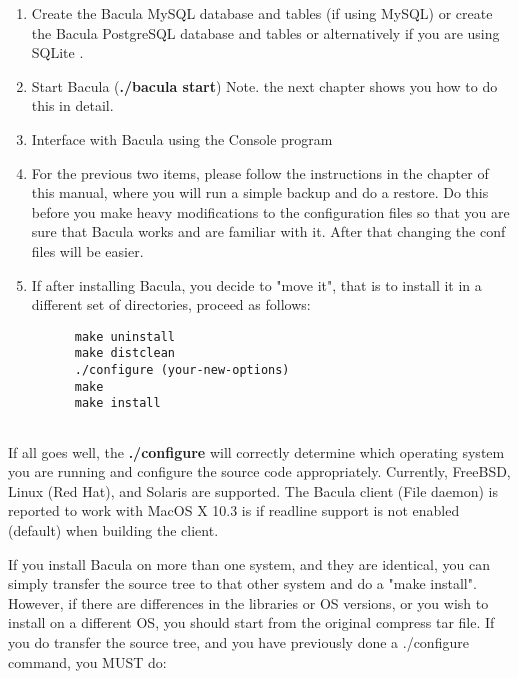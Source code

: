 \begin{enumerate}
\label{CreateDatabase}
\item Create the Bacula MySQL database and tables
   (if using MySQL)
       or 
      create the Bacula PostgreSQL database and tables  
    or alternatively  if you are using
   SQLite .  

\item Start Bacula ({\bf ./bacula start}) Note. the next chapter  shows you
   how to do this in detail.  

\item Interface with Bacula using the Console program  

\item For the previous two items, please follow the instructions  in the 
    chapter of  this manual,
   where you will run a simple backup and do a  restore. Do this before you make
   heavy modifications to the  configuration files so that you are sure that
   Bacula works  and are familiar with it. After that changing the conf files 
   will be easier.  

\item If after installing Bacula, you decide to "move it", that is  to
   install it in a different set of directories, proceed  as follows:  

\footnotesize
\begin{verbatim}
      make uninstall
      make distclean
      ./configure (your-new-options)
      make
      make install
      
\end{verbatim}
\normalsize

\end{enumerate}

If all goes well, the {\bf ./configure} will correctly determine which
operating system you are running and configure the source code appropriately.
Currently, FreeBSD, Linux (Red Hat), and Solaris are supported. The Bacula
client (File daemon) is reported to work with MacOS X 10.3 is if 
readline support is not enabled (default) when building the client.       

If you install Bacula on more than one system, and they are identical, you can
simply transfer the source tree to that other system and do a "make
install". However, if there are differences in the libraries or OS versions,
or you wish to install on a different OS, you should start from the original
compress tar file. If you do transfer the source tree, and you have previously
done a ./configure command, you MUST do: 

